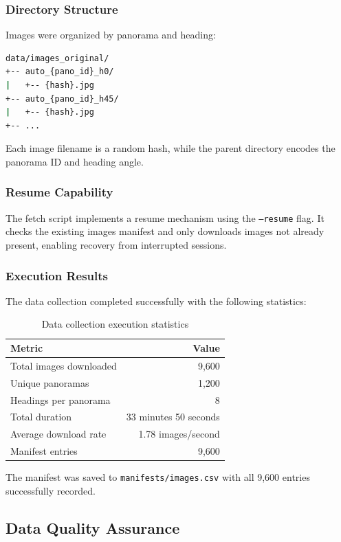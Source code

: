 \documentclass[12pt,a4paper]{article}
\begin{document}
\subsubsection{Directory Structure}

Images were organized by panorama and heading:

\begin{lstlisting}[language=bash]
data/images_original/
+-- auto_{pano_id}_h0/
|   +-- {hash}.jpg
+-- auto_{pano_id}_h45/
|   +-- {hash}.jpg
+-- ...
\end{lstlisting}

Each image filename is a random hash, while the parent directory encodes the panorama ID and heading angle.

\subsubsection{Resume Capability}

The fetch script implements a resume mechanism using the \texttt{--resume} flag. It checks the existing images manifest and only downloads images not already present, enabling recovery from interrupted sessions.

\subsubsection{Execution Results}

The data collection completed successfully with the following statistics:

\begin{table}[H]
\centering
\begin{tabular}{lr}
\toprule
\textbf{Metric} & \textbf{Value} \\
\midrule
Total images downloaded & 9,600 \\
Unique panoramas & 1,200 \\
Headings per panorama & 8 \\
Total duration & 33 minutes 50 seconds \\
Average download rate & 1.78 images/second \\
Manifest entries & 9,600 \\
\bottomrule
\end{tabular}
\caption{Data collection execution statistics}
\end{table}

The manifest was saved to \texttt{manifests/images.csv} with all 9,600 entries successfully recorded.
\subsection{Data Quality Assurance}
\end{document}
